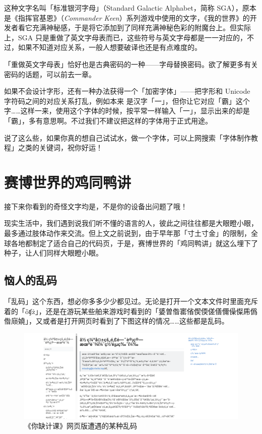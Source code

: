 这种文字名叫「标准银河字母」（Standard Galactic Alphabet，简称 SGA），原本是《指挥官基恩》（\textit{Commander Keen}）系列游戏中使用的文字，《我的世界》的开发者看它充满神秘感，于是将它添加到了同样充满神秘色彩的附魔台上。但实际上，SGA 只是重做了英文字母表而已，这些符号与英文字母都是一一对应的，不过，如果不知道对应关系，一般人想要破译也还是有点难度的。

\begin{note}
  「重做英文字母表」恰好也是古典密码的一种——字母替换密码。欲了解更多有关密码的话题，可以前去一章。
\end{note}

如果不会设计字形，还有一种办法获得一个「加密字体」——把字形和 Unicode 字符码之间的对应关系打乱，例如本来  是汉字「一」，但你让它对应「霸」这个字……这样一来，使用这个字体的时候，按平常一样输入「一」，显示出来的却是「霸」，多有意思啊。不过我们不建议把这样的字体用于正式用途。

说了这么些，如果你真的想自己试试水，做一个字体，可以上网搜索「字体制作教程」之类的关键词，祝你好运！

\section{赛博世界的鸡同鸭讲}

\begin{warning}
  接下来你看到的奇怪文字均是，不是你的设备出问题了哦！
\end{warning}

现实生活中，我们遇到说我们听不懂的语言的人，彼此之间往往都是大眼瞪小眼，最多通过肢体动作来交流。但上文之前说到，由于早年那「寸土寸金」的限制，全球各地都制定了适合自己的代码页，于是，赛博世界的「鸡同鸭讲」就这么埋下了种子，让人们同样大眼瞪小眼。

\subsection{恼人的乱码}

「乱码」这个东西，想必你多多少少都见过。无论是打开一个文本文件时里面充斥着的「\replacesymb\replacesymb{}ȱʧ\replacesymb \replacesymb\replacesymb\replacesymb{}\replacesymb{}ż\replacesymb\replacesymb\replacesymb\replacesymb\replacesymb\replacesymb」，还是在游玩某些舶来游戏时看到的「婱曽偺寚偗偰偄傞僐儞僺儏乕僞偺庼嬈」，又或者是打开网页时看到了下图这样的情况……这些都是乱码。

\begin{figure}[htb!]
  \centering
  \includegraphics[width=.98\textwidth]{assets/advanced/MissingButWindows1252.png}
  \caption{《你缺计课》网页版遭遇的某种乱码}
  \label{fig:MissingButWindows1252}
\end{figure}

